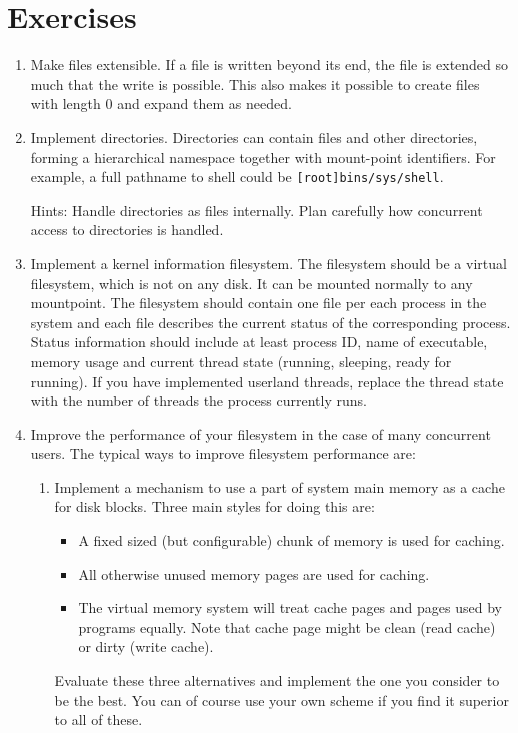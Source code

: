 \documentclass[twoside,a4paper]{report}
\newenvironment{exercises}[1][\addcontentsline{toc}{section}{Exercises}%
\section*{Exercises}\markright{EXERCISES}]{%
#1%
\begin{enumerate}%
}{%
\end{enumerate}
}
\newcounter{exercisec}[chapter]
\newcommand{\cexercise}[1]{%
\item[\stepcounter{exercisec}{\huge\Keyboard}\hspace{5mm}\textbf{\arabic{chapter}.\theexercisec{}.}] #1%
}
\begin{document}
\begin{exercises}
\cexercise{Make files extensible. If a file is written beyond its end,
the file is extended so much that the write is possible. This also
makes it possible to create files with length 0 and expand them as
needed.}

\cexercise{Implement directories. Directories can contain files and
other directories, forming a hierarchical namespace together with
mount-point identifiers. For example, a full pathname to shell could be
\texttt{[root]bins/sys/shell}.

Hints: Handle directories as files internally. Plan carefully how
concurrent access to directories is handled.}

\cexercise{Implement a kernel information filesystem. The filesystem
should be a virtual filesystem, which is not on any disk. It can be
mounted normally to any mountpoint. The filesystem should contain one
file per each process in the system and each file describes the
current status of the corresponding process. Status information should
include at least process ID, name of executable, memory usage and
current thread state (running, sleeping, ready for running). If you
have implemented userland threads, replace the thread state with the
number of threads the process currently runs.}

\cexercise{Improve the performance of your filesystem in the case of
many concurrent users. The typical ways to improve filesystem
performance are:

\begin{enumerate}

\item Implement a mechanism to use a part of system main memory as a
cache for disk blocks. Three main styles for doing this are:

\begin{itemize}

\item A fixed sized (but configurable) chunk of memory is used for caching.

\item All otherwise unused memory pages are used for caching.

\item The virtual memory system will treat cache pages and pages used
by programs equally. Note that cache page might be clean (read cache)
or dirty (write cache).

\end{itemize}

Evaluate these three alternatives and implement the one you
consider to be the best. You can of course use your own scheme if you
find it superior to all of these.


\end{enumerate}}
\end{exercises}
\end{document}
